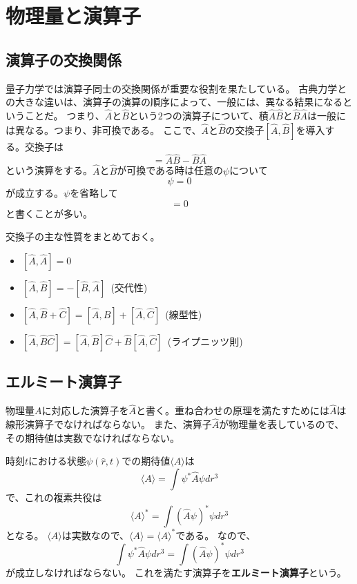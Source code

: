 \section{物理量と演算子}
\subsection{演算子の交換関係}
量子力学では演算子同士の交換関係が重要な役割を果たしている。
古典力学との大きな違いは、演算子の演算の順序によって、一般には、異なる結果になるということだ。
つまり、$\hat{A}$と$\hat{B}$という$2$つの演算子について、積$\hat{A}\hat{B}$と$\hat{B}\hat{A}$は一般には異なる。つまり、非可換である。
ここで、$\hat{A}$と$\hat{B}$の交換子$[\hat{A},\hat{B}]$を導入する。交換子は
\begin{equation}
	[\hat{A},\hat{B}] = \hat{A}\hat{B} - \hat{B}\hat{A}
\end{equation}
という演算をする。$\hat{A}$と$\hat{B}$が可換である時は任意の$\psi$について
\begin{equation}
	[\hat{A},\hat{B}]\psi = 0
\end{equation}
が成立する。$\psi$を省略して
\begin{equation}
	[\hat{A},\hat{B}] = 0
\end{equation}
と書くことが多い。

交換子の主な性質をまとめておく。
\begin{itemize}
	\item $[\hat{A},\hat{A}] = 0$
	\item $[\hat{A},\hat{B}] = - [\hat{B},\hat{A}]$~(交代性)
	\item $[\hat{A},\hat{B} + \hat{C}] = [\hat{A},\hat{B}] + [\hat{A},\hat{C}]$~(線型性)
	\item $[\hat{A},\hat{B}\hat{C}] = [\hat{A},\hat{B}]\hat{C} + \hat{B}[\hat{A},\hat{C}]$~(ライプニッツ則)
\end{itemize}


\subsection{エルミート演算子}
物理量$A$に対応した演算子を$\hat{A}$と書く。重ね合わせの原理を満たすためには$\hat{A}$は線形演算子でなければならない。
また、演算子$\hat{A}$が物理量を表しているので、その期待値は実数でなければならない。

時刻$t$における状態$\psi(\hat{r},t)$での期待値$\langle A \rangle$は
\begin{equation}
	\langle A \rangle = \int \psi^* \hat{A} \psi dr^3
\end{equation}
で、これの複素共役は
\begin{equation}
	\langle A \rangle^* = \int (\hat{A}\psi)^* \psi dr^3
\end{equation}
となる。
$\langle A \rangle$は実数なので、$\langle A \rangle = \langle A \rangle^*$である。
なので、
\begin{equation}
	\label{ope_require}
	\int \psi^* \hat{A} \psi dr^3 = \int (\hat{A}\psi)^* \psi dr^3
\end{equation}
が成立しなければならない。
これを満たす演算子を{\bf エルミート演算子}という。

